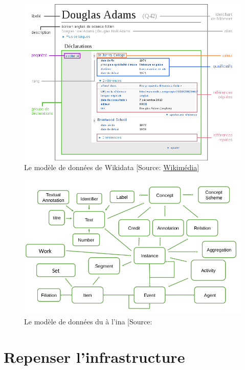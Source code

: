 \begin{figure}[!h]
	\centering
	\includegraphics[width=16cm]{images/modele_wikidata.png}
	\caption[Le modèle de données de Wikidata]{Le modèle de données de Wikidata [Source: \href{https://upload.wikimedia.org/wikipedia/commons/thumb/c/ce/Datamodel_in_Wikidata_fr.svg/330px-Datamodel_in_Wikidata_fr.svg.png}{Wikimédia}]}
	\label{wikidata}
\end{figure}

\begin{figure}[!h]
	\centering
	\includegraphics[width=16cm]{images/schema_global_lac.png}
	\caption[Le modèle de données du \ldd à l'\ac{ina}]{Le modèle de données du \ldd à l'\ac{ina} [Source:\cite[d.13]{roche-diore_atelier_2020}}
	\label{modele_ldd}
\end{figure}

\chapter{\label{annexe_lac}Repenser l'infrastructure}

